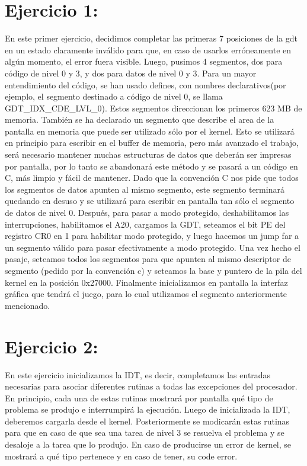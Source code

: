 \documentclass[a4paper]{article}
\begin{document}
\section{Ejercicio 1:}
En este primer ejercicio, decidimos completar las primeras 7 posiciones de la gdt en un estado claramente inválido para que, en caso de usarlos erróneamente en algún momento, el error fuera visible. Luego, pusimos 4 segmentos, dos para código de nivel 0 y 3, y dos para datos de nivel 0 y 3. Para un mayor entendimiento del código, se han usado defines, con nombres declarativos(por ejemplo, el segmento destinado a código de nivel 0, se llama GDT_IDX_CDE_LVL_0). Estos segmentos direccionan los primeros 623 MB de memoria. También se ha declarado un segmento que describe el area de la pantalla en memoria que puede ser utilizado sólo por el kernel. Esto se utilizará en principio para escribir en el buffer de memoria, pero más avanzado el trabajo, será necesario mantener muchas estructuras de datos que deberán ser impresas por pantalla, por lo tanto se abandonará este método y se pasará a un código en C, más limpio y fácil de mantener. Dado que la convención C nos pide que todos los segmentos de datos apunten al mismo segmento, este segmento terminará quedando en desuso y se utilizará para escribir en pantalla tan sólo el segmento de datos de nivel 0. Después, para pasar a modo protegido, deshabilitamos las interrupciones, habilitamos el A20, cargamos la GDT, seteamos el bit PE del registro CR0 en 1 para habilitar modo protegido, y luego hacemos un jump far a un segmento válido para pasar efectivamente a modo protegido. Una vez hecho el pasaje, seteamos todos los segmentos para que apunten al mismo descriptor de segmento (pedido por la convención c) y seteamos la base y puntero de la pila del kernel en la posición 0x27000. Finalmente inicializamos en pantalla la interfaz gráfica que tendrá el juego, para lo cual utilizamos el segmento anteriormente mencionado.

%

\section{Ejercicio 2:} 
%

En este ejercicio inicializamos la IDT, es decir, completamos las entradas necesarias para asociar diferentes rutinas a todas las excepciones del procesador. En principio, cada una de estas rutinas mostrará por pantalla qué tipo de problema se produjo e interrumpirá la ejecución. Luego de inicializada la IDT, deberemos cargarla desde el kernel. Posteriormente se modicarán estas rutinas para que en caso de que sea una tarea de nivel 3 se resuelva el problema y se desaloje a la tarea que lo produjo.
En caso de producirse un error de kernel, se mostrará a qué tipo pertenece y en caso de tener, su code error.
\end{document}
